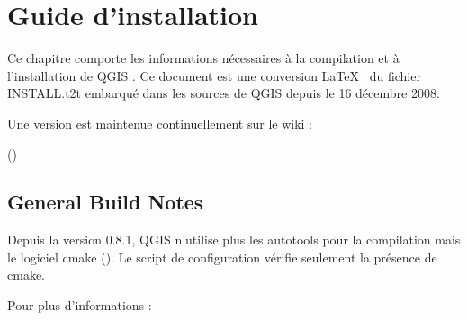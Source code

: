 \section{Guide d'installation}\label{label_install}

%
%

Ce chapitre comporte les informations nécessaires à la compilation et à
l'installation de QGIS \CURRENT. Ce document est une conversion \LaTeX~ du
fichier INSTALL.t2t embarqué dans les sources de QGIS depuis le 16 décembre
2008.

Une version est maintenue continuellement sur le wiki :

()
%
%  

\subsection{General Build Notes}
Depuis la version 0.8.1, QGIS n'utilise plus les autotools pour la compilation
mais le logiciel cmake
(). Le script de
configuration vérifie seulement la présence de cmake.

Pour plus d'informations :
  
